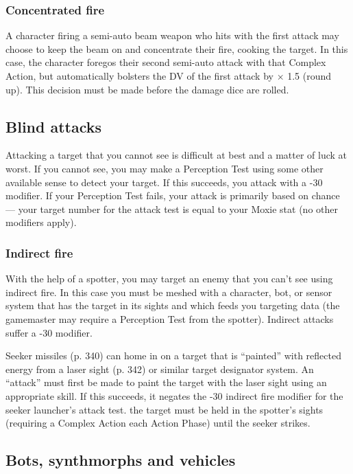 \subsubsection{Concentrated fire} 

A character firing a semi-auto beam weapon who hits with the first attack may choose to keep the beam on and concentrate their fire, cooking the target. In this case, the character foregos their second semi-auto attack with that Complex Action, but automatically bolsters the DV of the first attack by $\times$ 1.5 (round up). This decision must be made before the damage dice are rolled. 



\subsection{Blind attacks} \label{sec:blind-attacks} 

Attacking a target that you cannot see is difficult at best and a matter of luck at worst. If you cannot see, you may make a Perception Test using some other available sense to detect your target. If this succeeds, you attack with a -30 modifier. If your Perception Test fails, your attack is primarily based on chance --- your target number for the attack test is equal to your Moxie stat (no other modifiers apply). 

\subsubsection{Indirect fire} 

With the help of a spotter, you may target an enemy that you can’t see using indirect fire. In this case you must be meshed with a character, bot, or sensor system that has the target in its sights and which feeds you targeting data (the gamemaster may require a Perception Test from the spotter). Indirect attacks suffer a -30 modifier. 

Seeker missiles (p. 340) can home in on a target that is ``painted'' with reflected energy from a laser sight (p. 342) or similar target designator system. An ``attack'' must first be made to paint the target with the laser sight using an appropriate skill. If this succeeds, it negates the -30 indirect fire modifier for the seeker launcher’s attack test. the target must be held in the spotter’s sights (requiring a Complex Action each Action Phase) until the seeker strikes. 



\subsection{Bots, synthmorphs and vehicles} \label{sec:bots-synthmorphs-vehicles} 

